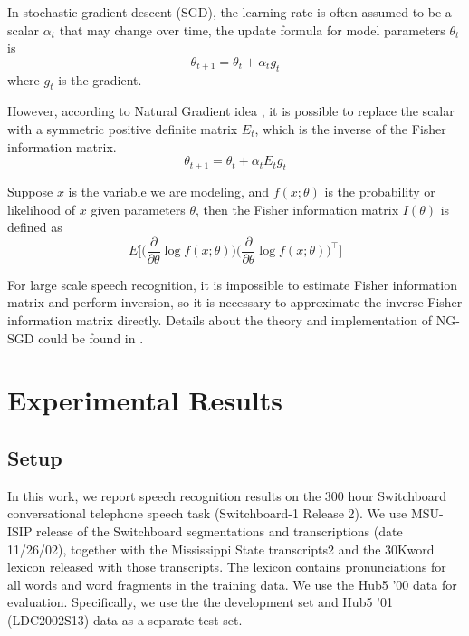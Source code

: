 \documentclass{article}
\begin{document}
In stochastic gradient descent (SGD), the learning rate is often assumed to be a scalar $\alpha_t$ that may change over time,
the update formula for model parameters $\theta_{t}$ is
\begin{equation}
\theta_{t+1} = \theta_{t} + \alpha_t g_t
\end{equation}
where $g_t$ is the gradient.

However, according to Natural Gradient idea \cite{murata1999statistical,roux2008topmoumoute}, it is possible to replace 
the scalar with a symmetric positive definite matrix $E_t$, which is the inverse of the Fisher information matrix.
\begin{equation}
\theta_{t+1} = \theta_{t} + \alpha_t E_t g_t
\end{equation}

Suppose $x$ is the variable we are modeling, and $f(x;\theta)$ is the probability or likelihood of $x$ given parameters $\theta$, then the
Fisher information matrix $I(\theta)$ is defined as
\begin{equation}
  E\bigg[\bigg(\frac{\partial}{\partial\theta}\log f(x;\theta)\bigg) \bigg(\frac{\partial}{\partial\theta}\log f(x;\theta)\bigg)^\top\bigg]
\end{equation}

For large scale speech recognition, it is impossible to estimate Fisher information matrix and perform inversion, 
so it is necessary to approximate the inverse Fisher information matrix directly. Details about the theory and 
implementation of NG-SGD could be found in \cite{povey2014parallel}.

\section{Experimental Results}
\subsection{Setup}
In this work, we report speech recognition results on the 300 hour Switchboard conversational telephone speech task 
(Switchboard-1 Release 2). We use MSU-ISIP release of the Switchboard segmentations and transcriptions (date 11/26/02),
together with the Mississippi State transcripts2 and the 30Kword lexicon released with those transcripts. 
The lexicon contains pronunciations for all words and word fragments in the training data. We use the Hub5 ’00 data for
evaluation. Specifically, we use the  the development set and Hub5 ’01 (LDC2002S13) data as a separate test set.
\end{document}
